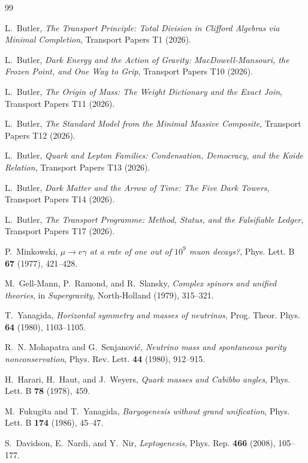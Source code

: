 \documentclass[11pt]{article}
\theoremstyle{definition}
\begin{document}
\begin{thebibliography}{99}

L.~Butler,
\emph{The Transport Principle: Total Division in Clifford Algebras via Minimal Completion},
Transport Papers T1 (2026).

L.~Butler,
\emph{Dark Energy and the Action of Gravity: MacDowell-Mansouri, the Frozen Point, and One Way to Grip},
Transport Papers T10 (2026).

L.~Butler,
\emph{The Origin of Mass: The Weight Dictionary and the Exact Join},
Transport Papers T11 (2026).

L.~Butler,
\emph{The Standard Model from the Minimal Massive Composite},
Transport Papers T12 (2026).

L.~Butler,
\emph{Quark and Lepton Families: Condensation, Democracy, and the Koide Relation},
Transport Papers T13 (2026).

L.~Butler,
\emph{Dark Matter and the Arrow of Time: The Five Dark Towers},
Transport Papers T14 (2026).

L.~Butler,
\emph{The Transport Programme: Method, Status, and the Falsifiable Ledger},
Transport Papers T17 (2026).

P.~Minkowski,
\emph{$\mu \to e\gamma$ at a rate of one out of $10^{9}$ muon decays?},
Phys. Lett. B \textbf{67} (1977), 421--428.

M.~Gell-Mann, P.~Ramond, and R.~Slansky,
\emph{Complex spinors and unified theories},
in \emph{Supergravity}, North-Holland (1979), 315--321.

T.~Yanagida,
\emph{Horizontal symmetry and masses of neutrinos},
Prog. Theor. Phys. \textbf{64} (1980), 1103--1105.

R.~N. Mohapatra and G.~Senjanovi\'c,
\emph{Neutrino mass and spontaneous parity nonconservation},
Phys. Rev. Lett. \textbf{44} (1980), 912--915.

H.~Harari, H.~Haut, and J.~Weyers,
\emph{Quark masses and Cabibbo angles},
Phys. Lett. B \textbf{78} (1978), 459.

M.~Fukugita and T.~Yanagida,
\emph{Baryogenesis without grand unification},
Phys. Lett. B \textbf{174} (1986), 45--47.

S.~Davidson, E.~Nardi, and Y.~Nir,
\emph{Leptogenesis},
Phys. Rep. \textbf{466} (2008), 105--177.


\end{thebibliography}
\end{document}
